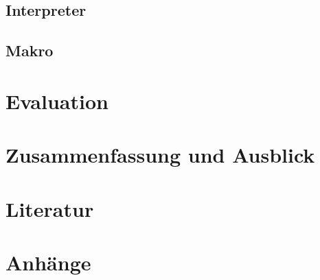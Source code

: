   \subsection{Interpreter}
  \label{ssec:Interpreter}

  \subsection{Makro}
  \label{ssec:Makro}

\section{Evaluation}
\label{sec:Evaluation}

\section{Zusammenfassung und Ausblick}
\label{sec:Zusammenfassung und Ausblick}

\section{Literatur}
\label{sec:Literatur}
  \nocite{*} %
  \printbibliography[heading=none]

\section{Anhänge}
\label{sec:Anhänge}


